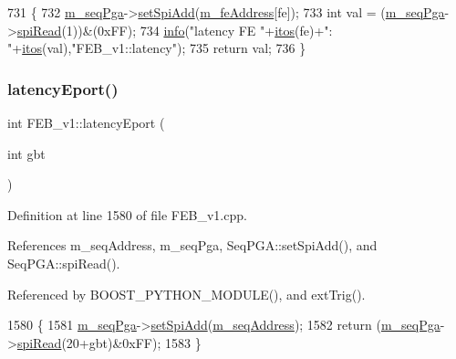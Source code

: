 \begin{DoxyCode}
731                            \{
732   \hyperlink{classFEB__v1_a6c7804ac86796f233a8393043adf2e77}{m\_seqPga}->\hyperlink{classSeqPGA_ac998ce3a6d9b5f2e88cc8393f8c1df53}{setSpiAdd}(\hyperlink{classFEB__v1_a4e1945c2d5b434125f375e9d0fc6d99f}{m\_feAddress}[fe]);
733   \textcolor{keywordtype}{int} val = (\hyperlink{classFEB__v1_a6c7804ac86796f233a8393043adf2e77}{m\_seqPga}->\hyperlink{classSeqPGA_ab3d0e5e5d4014bc7a92588a76b8713d4}{spiRead}(1))&(0xFF);
734   \hyperlink{classObject_a644fd329ea4cb85f54fa6846484b84a8}{info}(\textcolor{stringliteral}{"latency FE "}+\hyperlink{Tools_8h_af330027dbdafb9a30768b3613c553e60}{itos}(fe)+\textcolor{stringliteral}{": "}+\hyperlink{Tools_8h_af330027dbdafb9a30768b3613c553e60}{itos}(val),\textcolor{stringliteral}{"FEB\_v1::latency"});
735   \textcolor{keywordflow}{return} val;
736 \}
\end{DoxyCode}
\mbox{\label{classFEB__v1_a330c0a895c3c43acda2fd68e1cdb7368}} 
\subsubsection{\texorpdfstring{latency\+Eport()}{latencyEport()}\hspace{0.1cm}{\footnotesize\ttfamily [1/2]}}
{\footnotesize\ttfamily int F\+E\+B\+\_\+v1\+::latency\+Eport (\begin{DoxyParamCaption}\item[{int}]{gbt }\end{DoxyParamCaption})}



Definition at line 1580 of file F\+E\+B\+\_\+v1.\+cpp.



References m\+\_\+seq\+Address, m\+\_\+seq\+Pga, Seq\+P\+G\+A\+::set\+Spi\+Add(), and Seq\+P\+G\+A\+::spi\+Read().



Referenced by B\+O\+O\+S\+T\+\_\+\+P\+Y\+T\+H\+O\+N\+\_\+\+M\+O\+D\+U\+L\+E(), and ext\+Trig().


\begin{DoxyCode}
1580                                 \{
1581   \hyperlink{classFEB__v1_a6c7804ac86796f233a8393043adf2e77}{m\_seqPga}->\hyperlink{classSeqPGA_ac998ce3a6d9b5f2e88cc8393f8c1df53}{setSpiAdd}(\hyperlink{classFEB__v1_a1c1eb093fd1733b9510fcf8bc5c7ad08}{m\_seqAddress});
1582   \textcolor{keywordflow}{return} (\hyperlink{classFEB__v1_a6c7804ac86796f233a8393043adf2e77}{m\_seqPga}->\hyperlink{classSeqPGA_ab3d0e5e5d4014bc7a92588a76b8713d4}{spiRead}(20+gbt)&0xFF);
1583 \}
\end{DoxyCode}
\mbox{\label{classFEB__v1_a8ab1ff429d357779d682bdf28504bdd2}} 
